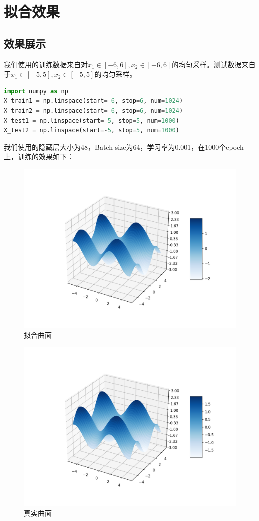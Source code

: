 \documentclass[UTF8]{ctexart}
\begin{document}
\section{拟合效果}
\subsection{效果展示}
我们使用的训练数据来自对$x_1\in[-6,6],x_2 \in [-6,6]$的均匀采样。测试数据来自于$x_1\in[-5,5],x_2 \in [-5,5]$的均匀采样。
\begin{lstlisting}[language=Python]
import numpy as np
X_train1 = np.linspace(start=-6, stop=6, num=1024)
X_train2 = np.linspace(start=-6, stop=6, num=1024)
X_test1 = np.linspace(start=-5, stop=5, num=1000)
X_test2 = np.linspace(start=-5, stop=5, num=1000)
\end{lstlisting}

我们使用的隐藏层大小为48，Batch size为64，学习率为0.001，在1000个epoch上，训练的效果如下：

\begin{figure}[htbp]
    \centering
    \includegraphics[width=5in]{figures/predict.png}
    \caption{拟合曲面}
    \label{fig:predict}
\end{figure}

\begin{figure}[htbp]
    \centering
    \includegraphics[width=5in]{figures/real.png}
    \caption{真实曲面}
    \label{fig:predict}
\end{figure}
\end{document}
